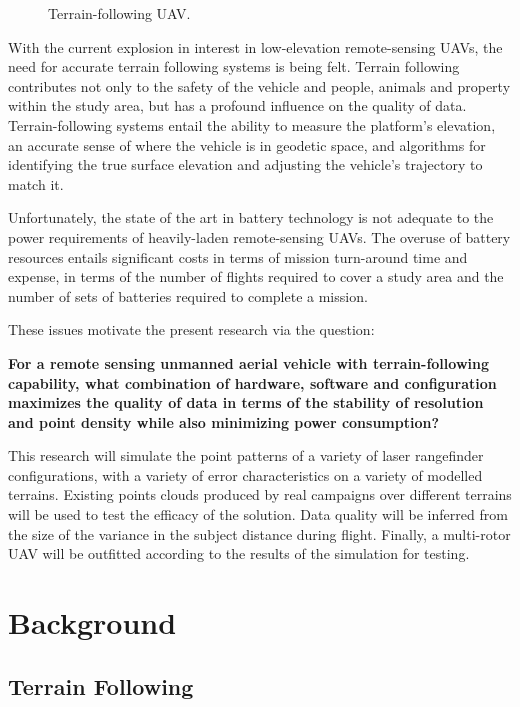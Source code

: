 \documentclass[10pt,a4paper]{report}
\begin{document}
\begin{figure}
\centering
\def\svgscale{0.5}

\caption{Terrain-following UAV.}
\label{fig:uav_terrain}
\end{figure}

With the current explosion in interest in low-elevation remote-sensing UAVs, the need for accurate terrain following systems is being felt. Terrain following contributes not only to the safety of the vehicle and people, animals and property within the study area, but has a profound influence on the quality of data. Terrain-following systems entail the ability to measure the platform's elevation, an accurate sense of where the vehicle is in geodetic space, and algorithms for identifying the true surface elevation and adjusting the vehicle's trajectory to match it.

Unfortunately, the state of the art in battery technology is not adequate to the power requirements of heavily-laden remote-sensing UAVs. The overuse of battery resources entails significant costs in terms of mission turn-around time and expense, in terms of the number of flights required to cover a study area and the number of sets of batteries required to complete a mission. 

These issues motivate the present research via the question:


\textbf{For a remote sensing unmanned aerial vehicle with terrain-following capability, what combination of hardware, software and configuration maximizes the quality of data in terms of the stability of resolution and point density while also minimizing power consumption?}

This research will simulate the point patterns of a variety of laser rangefinder configurations, with a variety of error characteristics on a variety of modelled terrains. Existing points clouds produced by real campaigns over different terrains will be used to test the efficacy of the solution. Data quality will be inferred from the size of the variance in the subject distance during flight. Finally, a multi-rotor UAV will be outfitted according to the results of the simulation for testing.

\section{Background}

\subsection{Terrain Following}
\end{document}
